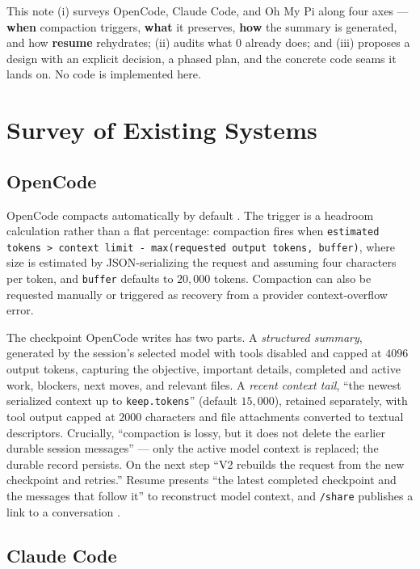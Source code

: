 \documentclass[11pt]{article}
\begin{document}
This note (i) surveys OpenCode, Claude Code, and Oh My Pi along four axes ---
\textbf{when} compaction triggers, \textbf{what} it preserves, \textbf{how} the
summary is generated, and how \textbf{resume} rehydrates; (ii) audits what 0
already does; and (iii) proposes a design with an explicit decision, a phased
plan, and the concrete code seams it lands on. No code is implemented here.

\section{Survey of Existing Systems}

\subsection{OpenCode}

OpenCode compacts automatically by default \cite{opencode-compaction}. The
trigger is a headroom calculation rather than a flat percentage: compaction
fires when \texttt{estimated tokens > context limit - max(requested output
tokens, buffer)}, where size is estimated by JSON-serializing the request and
assuming four characters per token, and \texttt{buffer} defaults to
$20{,}000$ tokens. Compaction can also be requested manually or triggered as
recovery from a provider context-overflow error.

The checkpoint OpenCode writes has two parts. A \emph{structured summary},
generated by the session's selected model with tools disabled and capped at
$4096$ output tokens, capturing the objective, important details, completed and
active work, blockers, next moves, and relevant files. A \emph{recent context
tail}, ``the newest serialized context up to \texttt{keep.tokens}''
(default $15{,}000$), retained separately, with tool output capped at $2000$
characters and file attachments converted to textual descriptors. Crucially,
``compaction is lossy, but it does not delete the earlier durable session
messages'' --- only the active model context is replaced; the durable record
persists. On the next step ``V2 rebuilds the request from the new checkpoint and
retries.'' Resume presents ``the latest completed checkpoint and the messages
that follow it'' to reconstruct model context, and \texttt{/share} publishes a
link to a conversation \cite{opencode-docs}.

\subsection{Claude Code}
\end{document}
